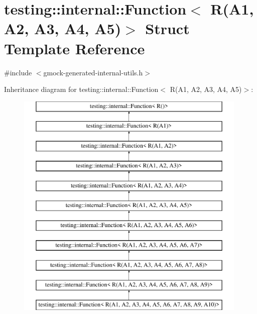 \hypertarget{structtesting_1_1internal_1_1Function_3_01R_07A1_00_01A2_00_01A3_00_01A4_00_01A5_08_4}{}\section{testing\+::internal\+::Function$<$ R(A1, A2, A3, A4, A5)$>$ Struct Template Reference}
\label{structtesting_1_1internal_1_1Function_3_01R_07A1_00_01A2_00_01A3_00_01A4_00_01A5_08_4}


{\ttfamily \#include $<$gmock-\/generated-\/internal-\/utils.\+h$>$}

Inheritance diagram for testing\+::internal\+::Function$<$ R(A1, A2, A3, A4, A5)$>$\+:\begin{figure}[H]
\begin{center}
\leavevmode
\includegraphics[height=11.000000cm]{structtesting_1_1internal_1_1Function_3_01R_07A1_00_01A2_00_01A3_00_01A4_00_01A5_08_4}
\end{center}
\end{figure}

